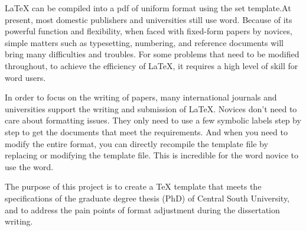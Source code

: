 \begin{abstracten}\setlength{\baselineskip}{20pt}
LaTeX can be compiled into a pdf of uniform format using the set template.At present, most domestic publishers and universities still use word. Because of its powerful function and flexibility, when faced with fixed-form papers by novices, simple matters such as typesetting, numbering, and reference documents will bring many difficulties and troubles. For some problems that need to be modified throughout, to achieve the efficiency of LaTeX, it requires a high level of skill for word users.

In order to focus on the writing of papers, many international journals and universities support the writing and submission of LaTeX. Novices don't need to care about formatting issues. They only need to use a few symbolic labels step by step to get the documents that meet the requirements. And when you need to modify the entire format, you can directly recompile the template file by replacing or modifying the template file. This is incredible for the word novice to use the word.

The purpose of this project is to create a TeX template that meets the specifications of the graduate degree thesis (PhD) of Central South University, and to address the pain points of format adjustment during the dissertation writing.
\end{abstracten}
